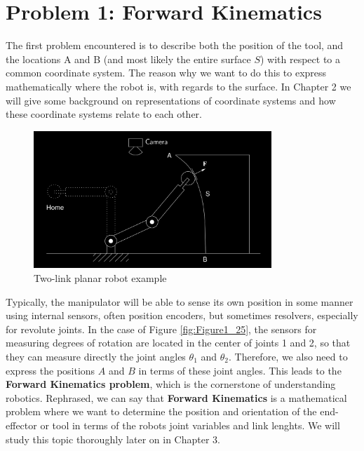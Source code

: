 \section*{Problem 1: Forward Kinematics} \label{Sec: Problem 1: Forward Kinematics}


	The first problem encountered is to describe both the position of the tool, and the locations
	A and B (and most likely the entire surface $S$) with respect to a common coordinate
	system. The reason why we want to do this to express mathematically where the robot is, with regards to the surface.
	In Chapter 2 we will give some background on representations of coordinate systems and how these coordinate systems relate to each other.\\

	\begin{figure}[H]
		\centering
		\includegraphics[width=0.8\textwidth]{img/Figure1_24.png}
		\caption{Two-link planar robot example}
		\label{fig:Figure1_24}
	\end{figure}

	Typically, the manipulator will be able to sense its own position in some manner using internal sensors, often position encoders, but sometimes resolvers, especially for revolute joints. In the case of Figure \ref{fig:Figure1_25}, the sensors for measuring degrees of rotation are located in the center of joints 1 and 2, so that they can measure directly the joint angles $\theta_1$ and $\theta_2$. Therefore, we also need to express the positions $A$ and $B$ in
	terms of these joint angles. This leads to the \textbf{Forward Kinematics problem}, which is the cornerstone of understanding robotics.
	Rephrased, we can say that \textbf{Forward Kinematics} is a mathematical problem where we want to determine the position and
	orientation of the end-effector or tool in terms of the robots joint variables and link lenghts. We will study this topic thoroughly later on in	Chapter 3.\\

